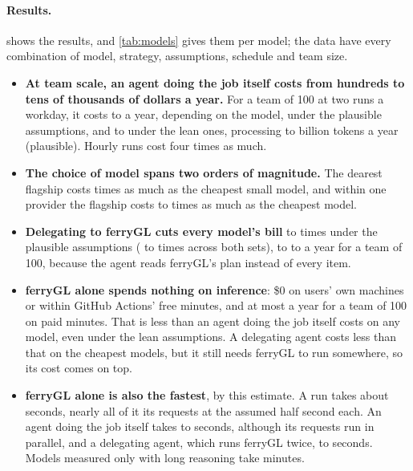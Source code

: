 \documentclass[11pt,a4paper]{article}
\newcommand{\ferry}{ferryGL}
\begin{document}
\paragraph{Results.}  shows the results, and \cref{tab:models} gives them per
model; the data have every combination of model, strategy, assumptions, schedule and team size.
\begin{itemize}
  \item \textbf{At team scale, an agent doing the job itself costs from hundreds to tens of
    thousands of dollars a year.} For a team of 100 at two runs a workday, it costs
    \CmpItselfHundredMin{} to \CmpItselfHundredMax{} a year, depending on the model, under the
    plausible assumptions, and \CmpItselfLeanHundredMin{} to \CmpItselfLeanHundredMax{} under
    the lean ones, processing \CmpTokensYearMin{} to \CmpTokensYearMax{} billion tokens a year
    (plausible). Hourly runs cost four times as much.
  \item \textbf{The choice of model spans two orders of magnitude.} The dearest flagship costs
    \CmpSpread{} times as much as the cheapest small model, and within one provider the flagship
    costs \CmpWithinMin{} to \CmpWithinMax{} times as much as the cheapest model.
  \item \textbf{Delegating to \ferry{} cuts every model's bill} \CmpSavesPlausibleMin{} to
    \CmpSavesPlausibleMax{} times under the plausible assumptions (\CmpSavesMin{} to
    \CmpSavesMax{} times across both sets), to \CmpDelegatingHundredMin{} to
    \CmpDelegatingHundredMax{} a year for a team of 100, because the agent reads \ferry's plan
    instead of every item.
  \item \textbf{\ferry{} alone spends nothing on inference}: \$0 on users' own machines or within
    GitHub Actions' free minutes, and at most \CmpActionsHundredYear{} a year for a team of 100 on
    paid minutes. That is less than an agent doing the job itself costs on any model, even under
    the lean assumptions. A delegating agent costs less than that on the \CmpBelowActions{}
    cheapest models, but it still needs \ferry{} to run somewhere, so its cost comes on top.
  \item \textbf{\ferry{} alone is also the fastest}, by this estimate. A run takes about
    \CmpFerryglSeconds{} seconds, nearly all of it its \CmpRequests{} requests at the assumed
    half second each. An agent doing the job itself takes \CmpItselfSecondsMin{} to
    \CmpItselfSecondsMax{} seconds, although its requests run in parallel, and a delegating
    agent, which runs \ferry{} twice, \CmpDelegatingSecondsMin{} to \CmpDelegatingSecondsMax{}
    seconds. Models measured only with long reasoning take minutes.
\end{itemize}
\end{document}
